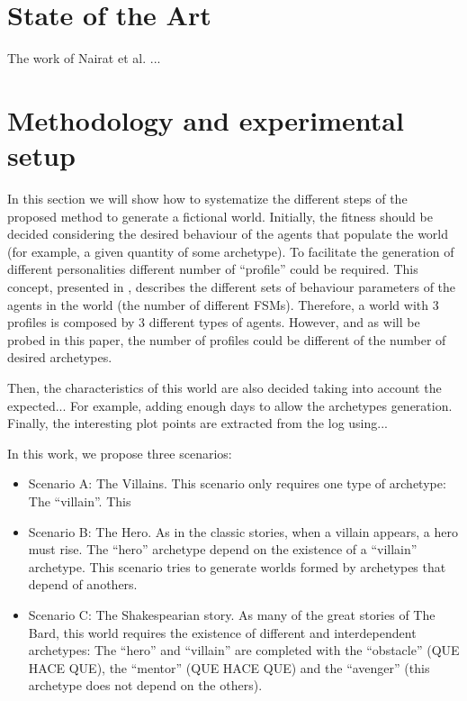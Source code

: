 \documentclass[runningheads,a4paper]{llncs}
\begin{document}
\section{State of the Art}

The work of Nairat et al. \cite{nairat:evolution} ...

\section{Methodology and experimental setup} %
\label{sec:met}

In this section we will show how to systematize the different steps of the proposed method to generate a fictional world. Initially, the fitness should be decided considering the desired behaviour of the agents that populate the world (for example, a given quantity of some archetype). To facilitate the generation of different personalities different number of ``profile'' could be required. This concept, presented in \cite{}, describes the different sets of behaviour parameters of the agents in the world (the number of different FSMs). Therefore, a world with 3 profiles is composed by 3 different types of agents. However, and as will be probed in this paper, the number of profiles could be different of the number of desired archetypes.

Then, the characteristics of this world are also decided taking into account the expected... For example, adding enough days to allow the archetypes generation. Finally, the interesting plot points are extracted from the log using... 



In this work, we propose three scenarios:
\begin{itemize}
\item Scenario A: The Villains. This scenario only requires one type of archetype: The ``villain''. This 
\item Scenario B: The Hero. As in the classic stories, when a villain appears, a hero must rise. The ``hero'' archetype depend on the existence of a ``villain'' archetype. This scenario tries to generate worlds formed by archetypes that depend of anothers.
\item Scenario C: The Shakespearian story. As many of the great stories of The Bard, this world requires the existence of different and interdependent archetypes: The ``hero'' and ``villain'' are completed with the ``obstacle'' (QUE HACE QUE), the  ``mentor'' (QUE HACE QUE) and the ``avenger'' (this archetype does not depend on the others).
\end{itemize}
\end{document}
